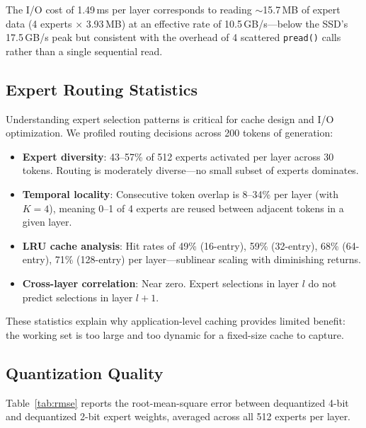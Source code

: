 \documentclass[11pt,twocolumn]{article}
\begin{document}
The I/O cost of 1.49\,ms per layer corresponds to reading $\sim$15.7\,MB of expert data (4 experts $\times$ 3.93\,MB) at an effective rate of 10.5\,GB/s---below the SSD's 17.5\,GB/s peak but consistent with the overhead of 4 scattered \texttt{pread()} calls rather than a single sequential read.

\subsection{Expert Routing Statistics}

Understanding expert selection patterns is critical for cache design and I/O optimization.
We profiled routing decisions across 200 tokens of generation:

\begin{itemize}[leftmargin=*,itemsep=2pt]
    \item \textbf{Expert diversity}: 43--57\% of 512 experts activated per layer across 30 tokens. Routing is moderately diverse---no small subset of experts dominates.
    \item \textbf{Temporal locality}: Consecutive token overlap is 8--34\% per layer (with $K=4$), meaning 0--1 of 4 experts are reused between adjacent tokens in a given layer.
    \item \textbf{LRU cache analysis}: Hit rates of 49\% (16-entry), 59\% (32-entry), 68\% (64-entry), 71\% (128-entry) per layer---sublinear scaling with diminishing returns.
    \item \textbf{Cross-layer correlation}: Near zero. Expert selections in layer $l$ do not predict selections in layer $l+1$.
\end{itemize}

These statistics explain why application-level caching provides limited benefit: the working set is too large and too dynamic for a fixed-size cache to capture.

\subsection{Quantization Quality}
\label{sec:quality}

Table~\ref{tab:rmse} reports the root-mean-square error between dequantized 4-bit and dequantized 2-bit expert weights, averaged across all 512 experts per layer.
\end{document}
